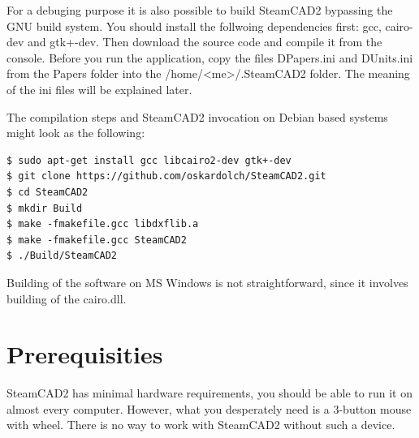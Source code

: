 For a debuging purpose it is also possible to build SteamCAD2 bypassing the GNU build system.
You should install the follwoing dependencies first: gcc, cairo-dev and gtk+-dev.
Then download the source code and compile it from the console. Before you run
the application, copy the files DPapers.ini and DUnits.ini from the Papers folder into the
/home/<me>/.SteamCAD2 folder. The meaning of the ini files will be explained later.

The compilation steps and SteamCAD2 invocation on Debian based systems might look as the following:
\begin{verbatim}
$ sudo apt-get install gcc libcairo2-dev gtk+-dev
$ git clone https://github.com/oskardolch/SteamCAD2.git
$ cd SteamCAD2
$ mkdir Build
$ make -fmakefile.gcc libdxflib.a
$ make -fmakefile.gcc SteamCAD2
$ ./Build/SteamCAD2
\end{verbatim}

Building of the software on MS Windows is not straightforward, since it involves building of
the cairo.dll.

\section{Prerequisities}

SteamCAD2 has minimal hardware requirements, you should be able to run it on almost every
computer. However, what you desperately need is a 3-button mouse with wheel. There is no way
to work with SteamCAD2 without such a device.

